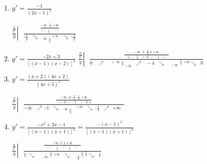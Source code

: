 \begin{solution}
\begin{enumerate}
\item ${y}'=\frac{-1}{{{\left( 2x-1 \right)}^{2}}}$

$\left. \frac{\frac{\text{x}}{{\text{{y}'}}}}{y} \right|\text{ }\frac{\frac{-\infty \text{                }\frac{\text{1}}{\text{2}}\text{              +}\infty }{-\text{        }\left. {} \right\|\text{      }-}}{\text{-}\frac{1}{2}\text{     }\searrow \text{     }{{\left. _{\text{-}\infty } \right\|}^{\text{+}\infty }}\text{    }\searrow \text{   -}\frac{1}{2}}$

\item ${y}'=\frac{-2x+3}{{{\left[ \left( x-1 \right)\left( x-2 \right) \right]}^{2}}}$
$\left. \frac{\frac{\text{x}}{{\text{{y}'}}}}{y} \right|\text{ }\frac{\frac{-\infty \text{           }1\text{                  }\frac{3}{2}\text{                  2        +}\infty }{\text{  }+\text{  }\left. \text{     } \right\|\text{   }+\text{           0         }-\text{      }\left\| {} \right.\text{   }-\text{ }}}{\text{0 }{{\left. \text{ }\nearrow \text{ }{{\text{ }}^{+\text{ }\infty }} \right\|}_{-\infty }}\text{   }\nearrow \text{  }-4\text{    }\searrow \text{   }{{\text{ }}_{-\infty }}\left\| ^{+\infty } \right.\searrow \text{  }0}$

\item ${y}'=\frac{\left( x+2 \right)\left( 4x+2 \right)}{{{\left( 4x+5 \right)}^{2}}}$

$\left. \frac{\frac{\text{x}}{{\text{{y}'}}}}{y} \right|\text{ }\frac{\frac{-\infty \text{                      -}2\text{                -}\frac{5}{4}\text{                   -}\frac{\text{1}}{\text{2}}\text{              +}\infty }{\text{    }+\text{            0   }-\text{        }\left. {} \right\|\text{       }-\text{           }0\text{        +}}}{-\infty \text{    }\nearrow \text{           -}1\text{    }\searrow \text{    }\left. _{\text{-}\infty } \right\|{{\text{ }}^{\text{+}\infty }}\text{  }\searrow \text{       -}\frac{\text{1}}{\text{4}}\text{   }\nearrow \text{ +}\infty \text{   }}$

\item ${y}'=\frac{-{{x}^{2}}+2x-1}{{{\left[ \left( x-1 \right)\left( x+1 \right) \right]}^{2}}}=\frac{-{{\left( x-1 \right)}^{2}}}{{{\left[ \left( x-1 \right)\left( x+1 \right) \right]}^{2}}}$

$\left. \frac{\frac{\text{x}}{{\text{{y}'}}}}{y} \right|\text{ }\frac{\frac{-\infty \text{             -}1\text{                1        +}\infty }{\text{  }-\text{  }\left. \text{         } \right\|\text{       }-\text{      }\left\| {} \right.\text{     }-\text{ }}}{\text{1  }\searrow \text{   }{{\text{ }}_{-\infty }}\left\| ^{+\infty } \right.\text{ }\searrow \text{   }{{\text{ }}_{\frac{3}{2}}}\left\| ^{\frac{3}{2}} \right.\searrow \text{   }1}$
\end{enumerate}
\end{solution}

